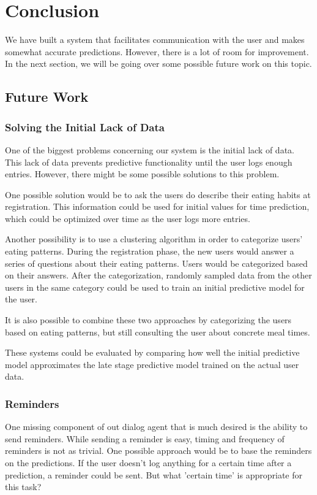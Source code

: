 
\chapter{Conclusion}\label{chapter:conclusion}
We have built a system that facilitates communication with the user and makes somewhat accurate predictions.
However, there is a lot of room for improvement.
In the next section, we will be going over some possible future work on this topic.
\section{Future Work}
\subsection{Solving the Initial Lack of Data}
One of the biggest problems concerning our system is the initial lack of data.
This lack of data prevents predictive functionality until the user logs enough entries.
However, there might be some possible solutions to this problem.

One possible solution would be to ask the users do describe their eating habits at registration.
This information could be used for initial values for time prediction, which could be optimized over time as the user logs more entries.

Another possibility is to use a clustering algorithm in order to categorize users' eating patterns.
During the registration phase, the new users would answer a series of questions about their eating patterns.
Users would be categorized based on their answers.
After the categorization, randomly sampled data from the other users in the same category could be used to train an initial predictive model for the user.

It is also possible to combine these two approaches by categorizing the users based on eating patterns, but still consulting the user about concrete meal times.

These systems could be evaluated by comparing how well the initial predictive model approximates the late stage predictive model trained on the actual user data.

\subsection{Reminders}
One missing component of out dialog agent that is much desired is the ability to send reminders.
While sending a reminder is easy, timing and frequency of reminders is not as trivial.
One possible approach would be to base the reminders on the predictions.
If the user doesn't log anything for a certain time after a prediction, a reminder could be sent.
But what 'certain time' is appropriate for this task?

